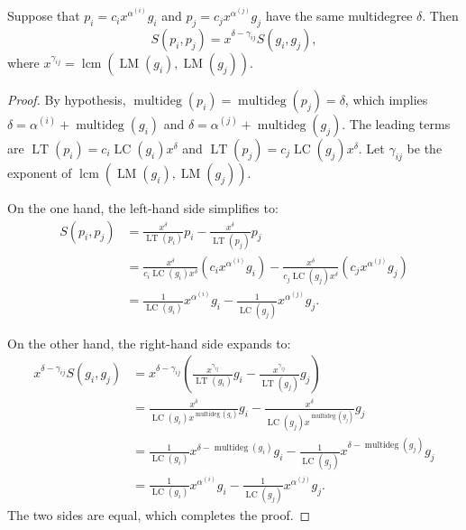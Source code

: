\begin{lemma}\label{lem:S-polynomials_and_Monomial_Multiplication} %
  \leanok %
  Suppose that $p_i = c_i x^{\alpha^{(i)}} g_i$ and $p_j = c_j x^{\alpha^{(j)}} g_j$ have the same multidegree $\delta$. Then
  \[
  S(p_i, p_j) = x^{\delta - \gamma_{ij}} S(g_i, g_j),
  \]
  where $x^{\gamma_{ij}} = \operatorname{lcm}(\operatorname{LM}(g_i), \operatorname{LM}(g_j))$.
\end{lemma}
\begin{proof}
  \leanok
  By hypothesis, $\operatorname{multideg}(p_i) = \operatorname{multideg}(p_j) = \delta$, which implies $\delta = \alpha^{(i)} + \operatorname{multideg}(g_i)$ and $\delta = \alpha^{(j)} + \operatorname{multideg}(g_j)$.
  The leading terms are $\operatorname{LT}(p_i) = c_i \operatorname{LC}(g_i) x^\delta$ and $\operatorname{LT}(p_j) = c_j \operatorname{LC}(g_j) x^\delta$.
  Let $\gamma_{ij}$ be the exponent of $\operatorname{lcm}(\operatorname{LM}(g_i), \operatorname{LM}(g_j))$.

  On the one hand, the left-hand side simplifies to:
  \begin{align*}
  S(p_i, p_j) &= \frac{x^\delta}{\operatorname{LT}(p_i)} p_i - \frac{x^\delta}{\operatorname{LT}(p_j)} p_j \\
  &= \frac{x^\delta}{c_i \operatorname{LC}(g_i) x^\delta} (c_i x^{\alpha^{(i)}} g_i) - \frac{x^\delta}{c_j \operatorname{LC}(g_j) x^\delta} (c_j x^{\alpha^{(j)}} g_j) \\
  &= \frac{1}{\operatorname{LC}(g_i)} x^{\alpha^{(i)}} g_i - \frac{1}{\operatorname{LC}(g_j)} x^{\alpha^{(j)}} g_j.
  \end{align*}

  On the other hand, the right-hand side expands to:
  \begin{align*}
  x^{\delta - \gamma_{ij}} S(g_i, g_j)
  &= x^{\delta - \gamma_{ij}} \left( \frac{x^{\gamma_{ij}}}{\operatorname{LT}(g_i)} g_i - \frac{x^{\gamma_{ij}}}{\operatorname{LT}(g_j)} g_j \right) \\
  &= \frac{x^{\delta}}{\operatorname{LC}(g_i)x^{\operatorname{multideg}(g_i)}} g_i - \frac{x^{\delta}}{\operatorname{LC}(g_j)x^{\operatorname{multideg}(g_j)}} g_j \\
  &= \frac{1}{\operatorname{LC}(g_i)} x^{\delta - \operatorname{multideg}(g_i)} g_i - \frac{1}{\operatorname{LC}(g_j)} x^{\delta - \operatorname{multideg}(g_j)} g_j \\
  &= \frac{1}{\operatorname{LC}(g_i)} x^{\alpha^{(i)}} g_i - \frac{1}{\operatorname{LC}(g_j)} x^{\alpha^{(j)}} g_j.
  \end{align*}
  The two sides are equal, which completes the proof.
\end{proof}

